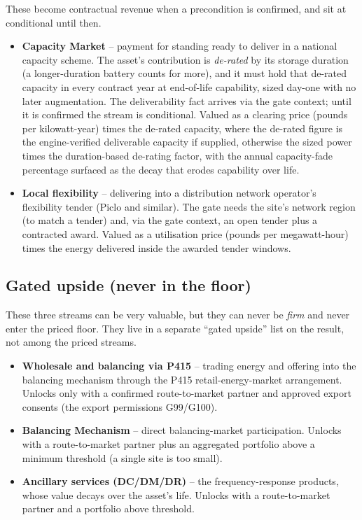 These become contractual revenue when a precondition is confirmed, and sit at conditional until then.

\begin{itemize}
  \item \textbf{Capacity Market} -- payment for standing ready to deliver in a national capacity scheme. The asset's contribution is \emph{de-rated} by its storage duration (a longer-duration battery counts for more), and it must hold that de-rated capacity in every contract year at end-of-life capability, sized day-one with no later augmentation. The deliverability fact arrives via the gate context; until it is confirmed the stream is conditional. Valued as a clearing price (pounds per kilowatt-year) times the de-rated capacity, where the de-rated figure is the engine-verified deliverable capacity if supplied, otherwise the sized power times the duration-based de-rating factor, with the annual capacity-fade percentage surfaced as the decay that erodes capability over life.
  \item \textbf{Local flexibility} -- delivering into a distribution network operator's flexibility tender (Piclo and similar). The gate needs the site's network region (to match a tender) and, via the gate context, an open tender plus a contracted award. Valued as a utilisation price (pounds per megawatt-hour) times the energy delivered inside the awarded tender windows.
\end{itemize}

\subsection{Gated upside (never in the floor)}

These three streams can be very valuable, but they can never be \emph{firm} and never enter the priced floor. They live in a separate ``gated upside'' list on the result, not among the priced streams.

\begin{itemize}
  \item \textbf{Wholesale and balancing via P415} -- trading energy and offering into the balancing mechanism through the P415 retail-energy-market arrangement. Unlocks only with a confirmed route-to-market partner and approved export consents (the export permissions G99/G100).
  \item \textbf{Balancing Mechanism} -- direct balancing-market participation. Unlocks with a route-to-market partner plus an aggregated portfolio above a minimum threshold (a single site is too small).
  \item \textbf{Ancillary services (DC/DM/DR)} -- the frequency-response products, whose value decays over the asset's life. Unlocks with a route-to-market partner and a portfolio above threshold.
\end{itemize}

